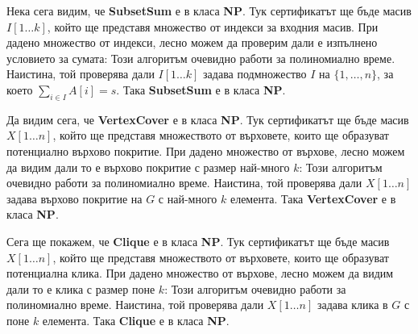 Нека сега видим, че \textbf{SubsetSum} е в класа \textbf{NP}.
Тук сертификатът ще бъде масив $I[1 \dots k]$, който ще представя множество от индекси за входния масив.
При дадено множество от индекси, лесно можем да проверим дали е изпълнено условието за сумата:
Този алгоритъм очевидно работи за полиномиално време.
Наистина, той проверява дали $I[1 \dots k]$ задава подмножество $I$ на $\{ 1, \dots, n \}$, за което $\sum\limits_{i \in I} A[i] = s$.
Така \textbf{SubsetSum} е в класа \textbf{NP}.

Да видим сега, че \textbf{VertexCover} е в класа \textbf{NP}.
Тук сертификатът ще бъде масив $X[1 \dots n]$, който ще представя множеството от върховете, които ще образуват потенциално върхово покритие.
При дадено множество от върхове, лесно можем да видим дали то е върхово покритие с размер най-много $k$:
Този алгоритъм очевидно работи за полиномиално време.
Наистина, той проверява дали $X[1 \dots n]$ задава върхово покритие на $G$ с най-много $k$ елемента.
Така \textbf{VertexCover} е в класа \textbf{NP}.

Сега ще покажем, че \textbf{Clique} е в класа \textbf{NP}.
Тук сертификатът ще бъде масив $X[1 \dots n]$, който ще представя множеството от върховете, които ще образуват потенциална клика.
При дадено множество от върхове, лесно можем да видим дали то е клика с размер поне $k$:
Този алгоритъм очевидно работи за полиномиално време.
Наистина, той проверява дали $X[1 \dots n]$ задава клика в $G$ с поне $k$ елемента.
Така \textbf{Clique} е в класа \textbf{NP}.